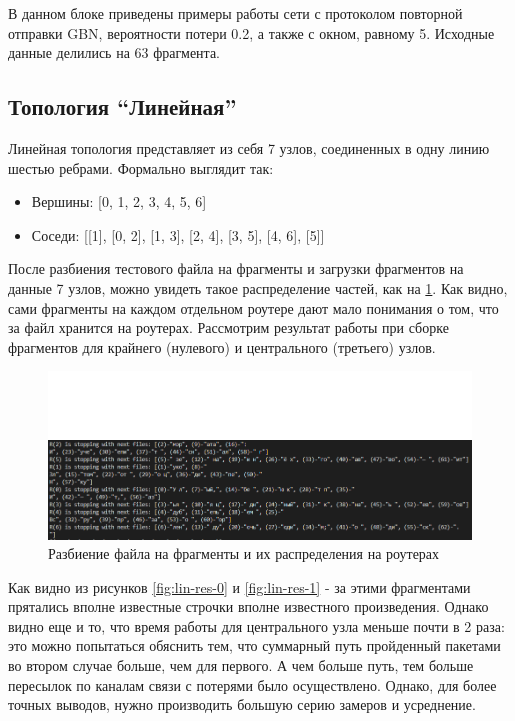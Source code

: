 В данном блоке приведены примеры работы сети с протоколом повторной отправки GBN, вероятности потери 0.2, а также с окном, равному 5. Исходные данные делились на 63 фрагмента.

\subsection{Топология ``Линейная''}

Линейная топология представляет из себя 7 узлов, соединенных в одну линию шестью ребрами. Формально выглядит так:
\begin{itemize}
    \item Вершины: [0, 1, 2, 3, 4, 5, 6]
    \item Соседи: [[1], [0, 2], [1, 3], [2, 4], [3, 5], [4, 6], [5]]
\end{itemize}

После разбиения тестового файла на фрагменты и загрузки фрагментов на данные 7 узлов, можно увидеть такое распределение частей, как на \ref{fig:lin-files}. Как видно, сами фрагменты на каждом отдельном роутере дают мало понимания о том, что за файл хранится на роутерах. Рассмотрим результат работы при сборке фрагментов для крайнего (нулевого) и центрального (третьего) узлов. 

\begin{figure}[H]
    \centering
    \includegraphics[width=0.88\linewidth]{imgs/lin-files.png}
    \caption{Разбиение файла на фрагменты и их распределения на роутерах}
    \label{fig:lin-files}
\end{figure}

Как видно из рисунков \ref{fig:lin-res-0} и \ref{fig:lin-res-1} - за этими фрагментами прятались вполне известные строчки вполне известного произведения. Однако видно еще и то, что время работы для центрального узла меньше почти в 2 раза: это можно попытаться обяснить тем, что суммарный путь пройденный пакетами во втором случае больше, чем для первого. А чем больше путь, тем больше пересылок по каналам связи с потерями было осуществлено. Однако, для более точных выводов, нужно производить большую серию замеров и усреднение. 

